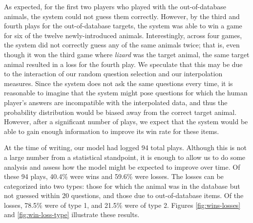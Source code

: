 \documentclass[11pt,a4paper]{article}
\begin{document}
As expected, for the first two players who played with the out-of-database animals, the system could not guess them correctly.
However, by the third and fourth plays for the out-of-database targets, the system was able to win a game for six of the twelve newly-introduced animals. %
Interestingly, across four games, the system did not correctly guess any of the same animals twice; that is, even though it won the third game where \textit{lizard} was the target animal, the same target animal resulted in a loss for the fourth play. 
We speculate that this may be due to the interaction of our random question selection and our interpolation measures. 
Since the system does not ask the same questions every time, it is reasonable to imagine that the system might pose questions for which the human player's answers are incompatible with the interpolated data, and thus the probability distribution would be biased away from the correct target animal. 
However, after a significant number of plays, we expect that the system would be able to gain enough information to improve its win rate for these items.

At the time of writing, our model had logged 94 total plays. Although this is not a large number from a statistical standpoint, it is enough to allow us to do some analysis and assess how the model might be expected to improve over time. Of these 94 plays, 40.4\% were wins and 59.6\% were losses. The losses can be categorized into two types: those for which the animal was in the database but not guessed within 20 questions, and those due to out-of-database items. Of the losses, 78.5\% were of type 1, and 21.5\% were of type 2. 
Figures \ref{fig:wins-losses} and \ref{fig:win-loss-type} illustrate these results. 
\end{document}
